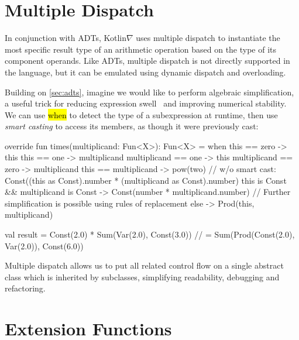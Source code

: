 \documentclass[12pt,initial,twoside,maitrise]{dms}
\newcommand{\inline}[1]{%
\begingroup%
\sethlcolor{slightgray}%
\hl{\ttfamily\small #1}%
\endgroup
}
\numberwithin{equation}{section}
\numberwithin{table}{chapter}
\numberwithin{figure}{chapter}
\begin{document}
\section{Multiple Dispatch}\label{sec:multiple-dispatch}

In conjunction with ADTs, Kotlin$\nabla$ uses multiple dispatch to instantiate the most specific result type of an arithmetic operation based on the type of its component operands. Like ADTs, multiple dispatch is not directly supported in the language, but it can be emulated using dynamic dispatch and overloading.

Building on \autoref{sec:adts}, imagine we would like to perform algebraic simplification, a useful trick for reducing expression swell~\citep{laue2019equivalence} and improving numerical stability. We can use \inline{when} to detect the type of a subexpression at runtime, then use \textit{smart casting} to access its members, as though it were previously cast:

\begin{kotlinlisting}
override fun times(multiplicand: Fun<X>): Fun<X> =
    when {
        this == zero -> this
        this == one -> multiplicand
        multiplicand == one -> this
        multiplicand == zero -> multiplicand
        this == multiplicand -> pow(two)
        // w/o smart cast: Const((this as Const).number * (multiplicand as Const).number)
        this is Const && multiplicand is Const -> Const(number * multiplicand.number)
        // Further simplification is possible using rules of replacement
        else -> Prod(this, multiplicand)
    }

val result = Const(2.0) * Sum(Var(2.0), Const(3.0))
//         = Sum(Prod(Const(2.0), Var(2.0)), Const(6.0))
\end{kotlinlisting}
%
Multiple dispatch allows us to put all related control flow on a single abstract class which is inherited by subclasses, simplifying readability, debugging and refactoring.

\section{Extension Functions}\label{sec:extension-functions}
\end{document}
